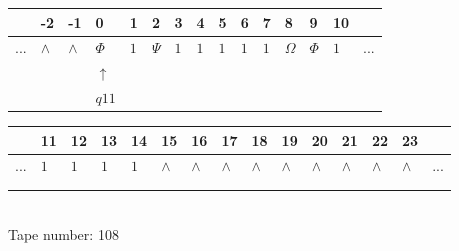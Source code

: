 \documentclass[11pt]{article}
\begin{document}
\begin{table}[H]
\centering
\begin{tabular}{lllllllllllllll}
 & -2 & -1 & 0 & 1 & 2 & 3 & 4 & 5 & 6 & 7 & 8 & 9 & 10 & \\
\hline
$...$ & \multicolumn{1}{|l|}{$\wedge$} & \multicolumn{1}{|l|}{$\wedge$} & \multicolumn{1}{|l|}{$\Phi$} & \multicolumn{1}{|l|}{$1$} & \multicolumn{1}{|l|}{$\Psi$} & \multicolumn{1}{|l|}{$1$} & \multicolumn{1}{|l|}{$1$} & \multicolumn{1}{|l|}{$1$} & \multicolumn{1}{|l|}{$1$} & \multicolumn{1}{|l|}{$1$} & \multicolumn{1}{|l|}{$\Omega$} & \multicolumn{1}{|l|}{$\Phi$} & \multicolumn{1}{|l|}{$1$} & $...$\\
\hline
&  &  & $\uparrow$ &  &  &  &  &  &  &  &  &  &  &  \\
&  &  & $ q11 $ &  &  &  &  &  &  &  &  &  &  &  \\
\end{tabular}
\begin{tabular}{lllllllllllllll}
 & 11 & 12 & 13 & 14 & 15 & 16 & 17 & 18 & 19 & 20 & 21 & 22 & 23 & \\
\hline
$...$ & \multicolumn{1}{|l|}{$1$} & \multicolumn{1}{|l|}{$1$} & \multicolumn{1}{|l|}{$1$} & \multicolumn{1}{|l|}{$1$} & \multicolumn{1}{|l|}{$\wedge$} & \multicolumn{1}{|l|}{$\wedge$} & \multicolumn{1}{|l|}{$\wedge$} & \multicolumn{1}{|l|}{$\wedge$} & \multicolumn{1}{|l|}{$\wedge$} & \multicolumn{1}{|l|}{$\wedge$} & \multicolumn{1}{|l|}{$\wedge$} & \multicolumn{1}{|l|}{$\wedge$} & \multicolumn{1}{|l|}{$\wedge$} & $...$\\
\hline
&  &  &  &  &  &  &  &  &  &  &  &  &  &  \\
&  &  &  &  &  &  &  &  &  &  &  &  &  &  \\
\end{tabular}
\\
Tape number: 108
\noindent\makebox[\linewidth]{\hdashrule{\textwidth}{1pt}{1pt}}\end{table}
\end{document}

